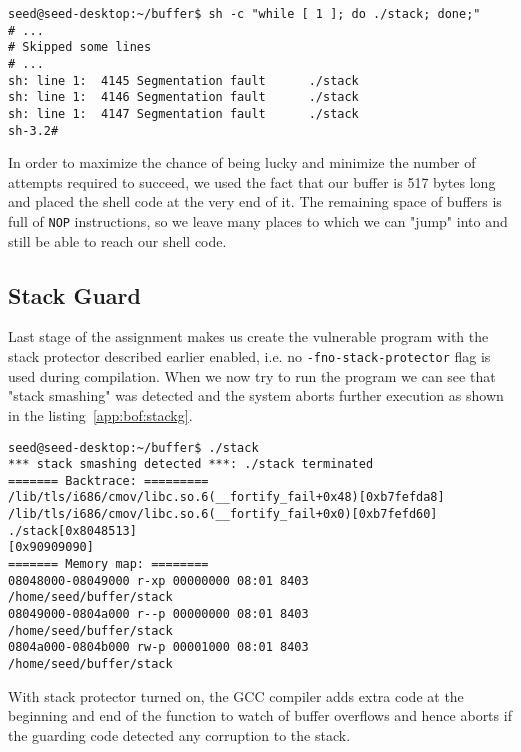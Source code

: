 \documentclass[12pt, a4paper, pdflatex]{article}
\begin{document}
\vspace{1em}
\lstset{
	captionpos=b,
	frame=single,
	language=BASH,
	breaklines=true,
	caption=Getting root access with address space randomization,
	label=bof:loop,
  float=tb
}
\begin{lstlisting}
seed@seed-desktop:~/buffer$ sh -c "while [ 1 ]; do ./stack; done;"
# ...
# Skipped some lines
# ...
sh: line 1:  4145 Segmentation fault      ./stack
sh: line 1:  4146 Segmentation fault      ./stack
sh: line 1:  4147 Segmentation fault      ./stack
sh-3.2# 

\end{lstlisting}

In order to maximize the chance of being lucky and minimize the number of attempts required to succeed, we used the fact that our buffer is 517 bytes long and placed the shell code at the very end of it. The remaining space of buffers is full of \texttt{NOP} instructions, so we leave many places to which we can "jump" into and still be able to reach our shell code.

\subsection{Stack Guard}

Last stage of the assignment makes us create the vulnerable program with the stack protector described earlier enabled, i.e. no \texttt{-fno-stack-protector} flag is used during compilation. When we now try to run the program we can see that "stack smashing" was detected and the system aborts further execution as shown in the listing~\ref{app:bof:stackg}.
\vspace{1em}
\lstset{
	captionpos=b,
	frame=single,
	language=BASH,
	breaklines=true,
	caption=Stack smashing detected,
	label=app:bof:stackg,
}
\begin{lstlisting}
seed@seed-desktop:~/buffer$ ./stack 
*** stack smashing detected ***: ./stack terminated
======= Backtrace: =========
/lib/tls/i686/cmov/libc.so.6(__fortify_fail+0x48)[0xb7fefda8]
/lib/tls/i686/cmov/libc.so.6(__fortify_fail+0x0)[0xb7fefd60]
./stack[0x8048513]
[0x90909090]
======= Memory map: ========
08048000-08049000 r-xp 00000000 08:01 8403       /home/seed/buffer/stack
08049000-0804a000 r--p 00000000 08:01 8403       /home/seed/buffer/stack
0804a000-0804b000 rw-p 00001000 08:01 8403       /home/seed/buffer/stack
\end{lstlisting}

With stack protector turned on, the GCC compiler adds extra code at the beginning and end of the function to watch of buffer overflows and hence aborts if the guarding code detected any corruption to the stack\cite{gnu13}.
\end{document}
